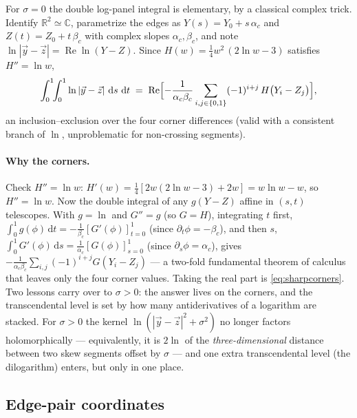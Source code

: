\documentclass[11pt]{article}
\newcommand{\dd}{\,\mathrm{d}}
\begin{document}
For $\sigma=0$ the double log-panel integral is elementary, by a classical complex
trick.  Identify $\mathbb R^2\simeq\mathbb C$, parametrize the edges as
$Y(s)=Y_0+s\,\alpha_c$ and $Z(t)=Z_0+t\,\beta_c$ with complex slopes
$\alpha_c,\beta_c$, and note $\ln|\vec y-\vec z| = \operatorname{Re}\ln(Y-Z)$.  Since
$H(w)=\tfrac14 w^2\,(2\ln w-3)$ satisfies $H''=\ln w$,
\begin{equation}
  \int_0^1\!\!\int_0^1 \ln|\vec y-\vec z|\,\dd s\,\dd t
  \;=\; \operatorname{Re}\Bigl[-\frac{1}{\alpha_c\beta_c}
        \sum_{i,j\in\{0,1\}} (-1)^{i+j}\, H\bigl(Y_i-Z_j\bigr)\Bigr],
  \label{eq:sharpcorners}
\end{equation}
an inclusion--exclusion over the four corner differences (valid with a consistent
branch of $\ln$, unproblematic for non-crossing segments).

\paragraph{Why the corners.}  Check $H''=\ln w$: $H'(w)=\tfrac14[2w(2\ln w-3)+2w]
=w\ln w-w$, so $H''=\ln w$.  Now the double integral of any $g(Y-Z)$ affine in
$(s,t)$ telescopes.  With $g=\ln$ and $G''=g$ (so $G=H$), integrating $t$ first,
$\int_0^1 g(\phi)\dd t=-\tfrac1{\beta_c}[G'(\phi)]_{t=0}^{1}$ (since
$\partial_t\phi=-\beta_c$), and then $s$,
$\int_0^1 G'(\phi)\dd s=\tfrac1{\alpha_c}[G(\phi)]_{s=0}^{1}$ (since
$\partial_s\phi=\alpha_c$), gives
$-\tfrac1{\alpha_c\beta_c}\sum_{i,j}(-1)^{i+j}G(Y_i-Z_j)$ --- a two-fold fundamental
theorem of calculus that leaves only the four corner values.  Taking the real part
is \eqref{eq:sharpcorners}.  Two lessons carry over
to $\sigma>0$: the answer lives on the corners, and the transcendental level is set
by how many antiderivatives of a logarithm are stacked.  For $\sigma>0$ the kernel
$\ln(|\vec y-\vec z|^2+\sigma^2)$ no longer factors holomorphically --- equivalently,
it is $2\ln$ of the \emph{three-dimensional} distance between two skew segments
offset by $\sigma$ --- and one extra transcendental level (the dilogarithm) enters,
but only in one place.

\subsection{Edge-pair coordinates}
\label{sec:coords}
\end{document}
